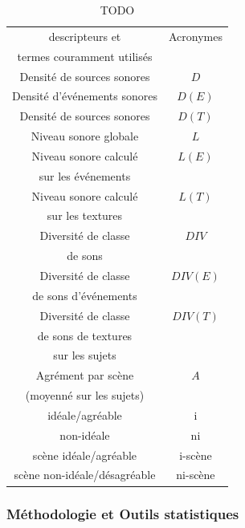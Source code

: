 \begin{table}[t]
\centering
\begin{tabular}{c c} 
descripteurs et         & Acronymes  \\       
termes couramment utilisés & \\                
\hline
Densité de sources sonores    & $D$  \\
Densité d’événements sonores & $D(E)$ \\
Densité de sources sonores   & $D(T)$ \\
Niveau sonore globale        & $L$  \\
Niveau sonore calculé        & $L(E)$ \\
sur les événements           &      \\
Niveau sonore calculé        & $L(T)$ \\
sur les textures             &      \\
Diversité de classe          & $DIV$   \\
de sons                      &         \\
Diversité de classe          & $DIV(E)$\\
de sons d'événements         &         \\
Diversité de classe          & $DIV(T)$\\
de sons de textures          &      \\
sur les sujets               &      \\
Agrément par scène           & $A$  \\
(moyenné sur les sujets)     &      \\
\hline
idéale/agréable                & i \\
non-idéale                    & ni \\
scène idéale/agréable         & i-scène \\
scène non-idéale/désagréable  & ni-scène \\
\hline
\end{tabular}
\vspace{0.5mm}
\caption{TODO}
\label{tab:acronyme}
\end{table}

\subsubsection{Méthodologie et Outils statistiques}
\label{sec:ch5_methodoEtStat}

